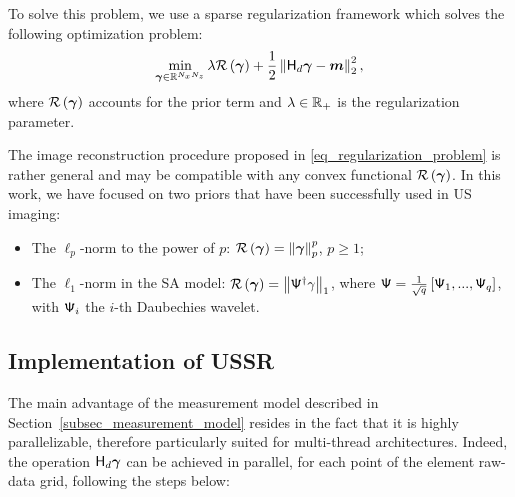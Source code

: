 \documentclass[conference]{IEEEtran}
\begin{document}
To solve this problem, we use a sparse regularization framework which solves the following optimization problem:
\begin{align}
	\label{eq_regularization_problem}
	\min \limits_{\bm{\gamma} \in \mathbb{R}^{N_xN_z}} \lambda \mathcal{R} \left(\bm{\gamma}\right) + \frac{1}{2} \left\lVert\mathsf{H}_d \bm{\gamma} - \bm{m}\right\rVert_{2}^2,
\end{align}
where $\mathcal{R} \left(\bm{\gamma}\right)$ accounts for the prior term and $\lambda \in \mathbb{R}_+$ is the regularization parameter. 

The image reconstruction procedure proposed in \eqref{eq_regularization_problem} is rather general and may be compatible with any convex functional $\mathcal{R} \left(\bm{\gamma}\right)$. In this work, we have focused on two priors that have been successfully used in US imaging:
\begin{itemize}
	\item The $\ell_p$-norm to the power of $p$: $\mathcal{R}\left(\bm{\gamma}\right) = \left\lVert\bm{\gamma}\right\rVert_{p}^p$, $p \geq 1$;
	\item The $\ell_1$-norm in the SA model: $\mathcal{R}\left(\bm{\gamma}\right) = \left\lVert\mathsf{\Psi}^\dagger\gamma\right\rVert_{1}$, where $\mathsf{\Psi} = \frac{1}{\sqrt{q}}\left[\mathsf{\Psi}_1,...,\mathsf{\Psi}_q\right]$, with $\mathsf{\Psi}_i$ the $i$-th Daubechies wavelet.
\end{itemize}
\subsection{Implementation of USSR}
\label{subsec_ussr_implementation}
\par The main advantage of the measurement model described in Section~\ref{subsec_measurement_model} resides in the fact that it is highly parallelizable, therefore particularly suited for multi-thread architectures. Indeed, the operation $\mathsf{H}_d\bm{\gamma}$ can be achieved in parallel, for each point of the element raw-data grid, following the steps below:
\end{document}
